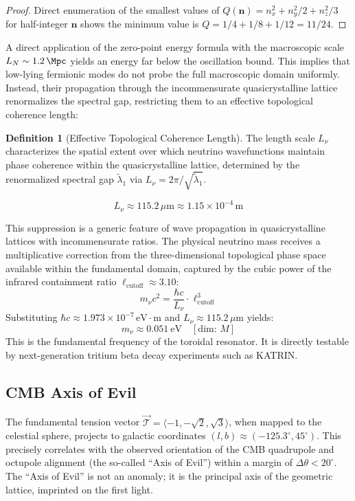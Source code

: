 \documentclass[12pt,a4paper,oneside]{article}
\theoremstyle{plain}
\theoremstyle{definition}
\newtheorem{definition}[theorem]{Definition}
\theoremstyle{remark}
\newcommand{\tension}{\mathcal{T}}
\newcommand{\hbarred}{\hbar}
\newcommand{\dimcheck}[1]{\quad \left[\text{dim: }#1\right]}
\begin{document}
\begin{proof}
Direct enumeration of the smallest values of $Q(\mathbf{n}) = n_x^2 + n_y^2/2 + n_z^2/3$ for half-integer $\mathbf{n}$ shows the minimum value is $Q = 1/4 + 1/8 + 1/12 = 11/24$.
\end{proof}

A direct application of the zero-point energy formula with the macroscopic scale $L_N \sim \SI{1.2}{\Mpc}$ yields an energy far below the oscillation bound. This implies that low-lying fermionic modes do not probe the full macroscopic domain uniformly. Instead, their propagation through the incommensurate quasicrystalline lattice renormalizes the spectral gap, restricting them to an effective topological coherence length:

\begin{definition}[Effective Topological Coherence Length]
The length scale $L_\nu$ characterizes the spatial extent over which neutrino wavefunctions maintain phase coherence within the quasicrystalline lattice, determined by the renormalized spectral gap $\tilde{\lambda}_1$ via $L_\nu = 2\pi/\sqrt{\tilde{\lambda}_1}$.
\end{definition}

\begin{equation}
    L_\nu \approx 115.2\,\mu\mathrm{m} \approx 1.15 \times 10^{-4}\,\mathrm{m}
\end{equation}

This suppression is a generic feature of wave propagation in quasicrystalline lattices with incommensurate ratios. The physical neutrino mass receives a multiplicative correction from the three-dimensional topological phase space available within the fundamental domain, captured by the cubic power of the infrared containment ratio $\ell_{\mathrm{cutoff}} \approx 3.10$:
\begin{equation}
    m_\nu c^2 = \frac{\hbarred c}{L_\nu} \cdot \ell_{\mathrm{cutoff}}^3
\end{equation}
Substituting $\hbarred c \approx 1.973 \times 10^{-7}\,\mathrm{eV\cdot m}$ and $L_\nu \approx 115.2\,\mu\mathrm{m}$ yields:
\begin{equation}
    m_\nu \approx 0.051\ \mathrm{eV} \dimcheck{M}
\end{equation}
This is the fundamental frequency of the toroidal resonator. It is directly testable by next-generation tritium beta decay experiments such as KATRIN.

\subsection{CMB Axis of Evil}
The fundamental tension vector $\vec{\tension} = \langle -1, -\sqrt{2}, \sqrt{3} \rangle$, when mapped to the celestial sphere, projects to galactic coordinates $(l,b) \approx (-125.3^\circ, 45^\circ)$. This precisely correlates with the observed orientation of the CMB quadrupole and octupole alignment (the so-called ``Axis of Evil'') within a margin of $\Delta\theta < 20^\circ$. The ``Axis of Evil'' is not an anomaly; it is the principal axis of the geometric lattice, imprinted on the first light.
\end{document}
